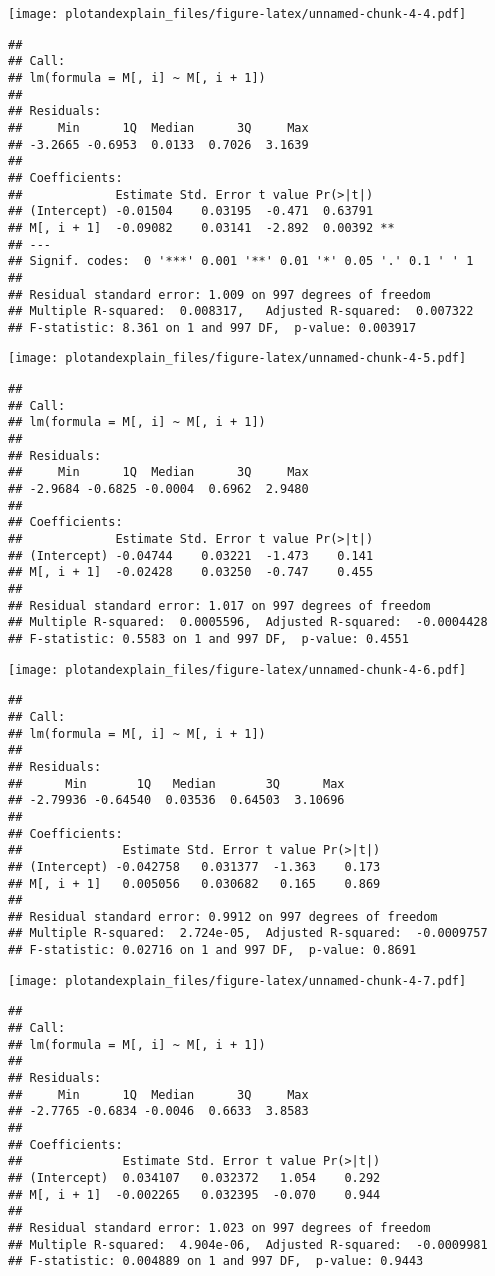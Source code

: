 \documentclass[]{article}
\begin{document}
\texttt{[image: plotandexplain\_files/figure-latex/unnamed-chunk-4-4.pdf]}

\begin{verbatim}
## 
## Call:
## lm(formula = M[, i] ~ M[, i + 1])
## 
## Residuals:
##     Min      1Q  Median      3Q     Max 
## -3.2665 -0.6953  0.0133  0.7026  3.1639 
## 
## Coefficients:
##             Estimate Std. Error t value Pr(>|t|)   
## (Intercept) -0.01504    0.03195  -0.471  0.63791   
## M[, i + 1]  -0.09082    0.03141  -2.892  0.00392 **
## ---
## Signif. codes:  0 '***' 0.001 '**' 0.01 '*' 0.05 '.' 0.1 ' ' 1
## 
## Residual standard error: 1.009 on 997 degrees of freedom
## Multiple R-squared:  0.008317,   Adjusted R-squared:  0.007322 
## F-statistic: 8.361 on 1 and 997 DF,  p-value: 0.003917
\end{verbatim}

\texttt{[image: plotandexplain\_files/figure-latex/unnamed-chunk-4-5.pdf]}

\begin{verbatim}
## 
## Call:
## lm(formula = M[, i] ~ M[, i + 1])
## 
## Residuals:
##     Min      1Q  Median      3Q     Max 
## -2.9684 -0.6825 -0.0004  0.6962  2.9480 
## 
## Coefficients:
##             Estimate Std. Error t value Pr(>|t|)
## (Intercept) -0.04744    0.03221  -1.473    0.141
## M[, i + 1]  -0.02428    0.03250  -0.747    0.455
## 
## Residual standard error: 1.017 on 997 degrees of freedom
## Multiple R-squared:  0.0005596,  Adjusted R-squared:  -0.0004428 
## F-statistic: 0.5583 on 1 and 997 DF,  p-value: 0.4551
\end{verbatim}

\texttt{[image: plotandexplain\_files/figure-latex/unnamed-chunk-4-6.pdf]}

\begin{verbatim}
## 
## Call:
## lm(formula = M[, i] ~ M[, i + 1])
## 
## Residuals:
##      Min       1Q   Median       3Q      Max 
## -2.79936 -0.64540  0.03536  0.64503  3.10696 
## 
## Coefficients:
##              Estimate Std. Error t value Pr(>|t|)
## (Intercept) -0.042758   0.031377  -1.363    0.173
## M[, i + 1]   0.005056   0.030682   0.165    0.869
## 
## Residual standard error: 0.9912 on 997 degrees of freedom
## Multiple R-squared:  2.724e-05,  Adjusted R-squared:  -0.0009757 
## F-statistic: 0.02716 on 1 and 997 DF,  p-value: 0.8691
\end{verbatim}

\texttt{[image: plotandexplain\_files/figure-latex/unnamed-chunk-4-7.pdf]}

\begin{verbatim}
## 
## Call:
## lm(formula = M[, i] ~ M[, i + 1])
## 
## Residuals:
##     Min      1Q  Median      3Q     Max 
## -2.7765 -0.6834 -0.0046  0.6633  3.8583 
## 
## Coefficients:
##              Estimate Std. Error t value Pr(>|t|)
## (Intercept)  0.034107   0.032372   1.054    0.292
## M[, i + 1]  -0.002265   0.032395  -0.070    0.944
## 
## Residual standard error: 1.023 on 997 degrees of freedom
## Multiple R-squared:  4.904e-06,  Adjusted R-squared:  -0.0009981 
## F-statistic: 0.004889 on 1 and 997 DF,  p-value: 0.9443
\end{verbatim}
\end{document}
